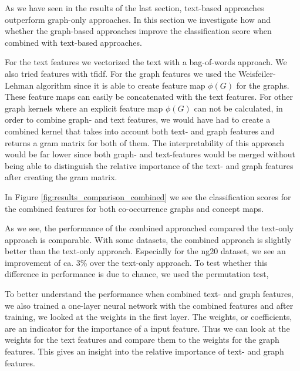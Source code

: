 
As we have seen in the results of the last section, text-based approaches outperform graph-only approaches.
In this section we investigate how and whether the graph-based approaches improve the classification score when combined with text-based approaches.

For the text features we vectorized the text with a bag-of-words approach. We also tried features with tfidf.
For the graph features we used the Weisfeiler-Lehman algorithm since it is able to create feature map $\phi(G)$ for the graphs.
These feature maps can easily be concatenated with the text features.
For other graph kernels where an explicit feature map $\phi(G)$ can not be calculated, in order to combine graph- and text features, we would have had to create a combined kernel that takes into account both text- and graph features and returns a gram matrix for both of them.
The interpretability of this approach would be far lower since both graph- and text-features would be merged without being able to distinguish the relative importance of the text- and graph features after creating the gram matrix.

In Figure \ref{fig:results_comparison_combined} we see the classification scores for the combined features for both co-occurrence graphs and concept maps.

As we see, the performance of the combined approached compared the text-only approach is comparable.
With some datasets, the combined approach is slightly better than the text-only approach. Especially for the ng20 dataset, we see an improvement of ca. 3\% over the text-only approach.
To test whether this difference in performance is due to chance, we used the permutation test, 

To better understand the performance when combined text- and graph features, we also trained a one-layer neural network with the combined features and after training, we looked at the weights in the first layer.
The weights, or coefficients, are an indicator for the importance of a input feature.
Thus we can look at the weights for the text features and compare them to the weights for the graph features.
This gives an insight into the relative importance of text- and graph features.



